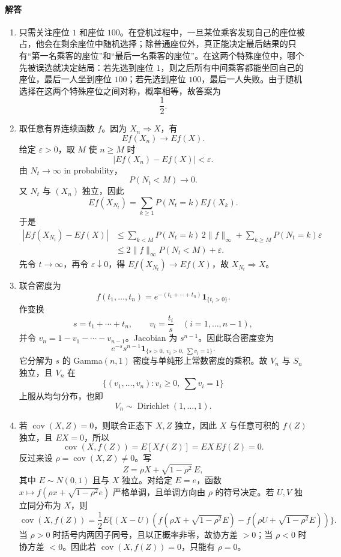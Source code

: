 \documentclass[UTF8,12pt]{ctexart}
\begin{document}
\paragraph{解答}
\begin{enumerate}[label=\textbf{\arabic*.},leftmargin=2.2em]
\item 只需关注座位 \(1\) 和座位 \(100\)。在登机过程中，一旦某位乘客发现自己的座位被占，他会在剩余座位中随机选择；除普通座位外，真正能决定最后结果的只有“第一名乘客的座位”和“最后一名乘客的座位”。在这两个特殊座位中，哪个先被误选就决定结局：若先选到座位 \(1\)，则之后所有中间乘客都能坐回自己的座位，最后一人坐到座位 \(100\)；若先选到座位 \(100\)，最后一人失败。由于随机选择在这两个特殊座位之间对称，概率相等，故答案为
\[
\frac12.
\]

\item 取任意有界连续函数 \(f\)。因为 \(X_n\Rightarrow X\)，有
\[
E f(X_n)\to E f(X).
\]
给定 \(\varepsilon>0\)，取 \(M\) 使 \(n\ge M\) 时
\[
|E f(X_n)-E f(X)|<\varepsilon.
\]
由 \(N_t\to\infty\) in probability，
\[
P(N_t<M)\to0.
\]
又 \(N_t\) 与 \((X_n)\) 独立，因此
\[
E f(X_{N_t})
=\sum_{k\ge1}P(N_t=k)E f(X_k).
\]
于是
\[
\begin{aligned}
|E f(X_{N_t})-E f(X)|
&\le \sum_{k<M}P(N_t=k)\,2\|f\|_\infty
+\sum_{k\ge M}P(N_t=k)\varepsilon\\
&\le 2\|f\|_\infty P(N_t<M)+\varepsilon.
\end{aligned}
\]
先令 \(t\to\infty\)，再令 \(\varepsilon\downarrow0\)，得 \(E f(X_{N_t})\to E f(X)\)，故 \(X_{N_t}\Rightarrow X\)。

\item 联合密度为
\[
f(t_1,\ldots,t_n)=e^{-(t_1+\cdots+t_n)}\mathbf1_{\{t_i>0\}}.
\]
作变换
\[
s=t_1+\cdots+t_n,\qquad v_i=\frac{t_i}{s}\quad (i=1,\ldots,n-1),
\]
并令 \(v_n=1-v_1-\cdots-v_{n-1}\)。Jacobian 为 \(s^{n-1}\)。因此联合密度变为
\[
e^{-s}s^{n-1}\mathbf1_{\{s>0,\ v_i>0,\ \sum v_i=1\}}.
\]
它分解为 \(s\) 的 Gamma\((n,1)\) 密度与单纯形上常数密度的乘积。故 \(V_n\) 与 \(S_n\) 独立，且 \(V_n\) 在
\[
\{(v_1,\ldots,v_n):v_i\ge0,\ \sum v_i=1\}
\]
上服从均匀分布，也即
\[
V_n\sim \operatorname{Dirichlet}(1,\ldots,1).
\]

\item 若 \(\operatorname{cov}(X,Z)=0\)，则联合正态下 \(X,Z\) 独立，因此 \(X\) 与任意可积的 \(f(Z)\) 独立，且 \(EX=0\)，所以
\[
\operatorname{cov}(X,f(Z))=E[Xf(Z)]=EX\,E f(Z)=0.
\]
反过来设 \(\rho=\operatorname{cov}(X,Z)\ne0\)。写
\[
Z=\rho X+\sqrt{1-\rho^2}\,E,
\]
其中 \(E\sim N(0,1)\) 且与 \(X\) 独立。对给定 \(E=e\)，函数 \(x\mapsto f(\rho x+\sqrt{1-\rho^2}e)\) 严格单调，且单调方向由 \(\rho\) 的符号决定。若 \(U,V\) 独立同分布为 \(X\)，则
\[
\operatorname{cov}(X,f(Z))
=\frac12 E\{(X-U)(f(\rho X+\sqrt{1-\rho^2}E)-f(\rho U+\sqrt{1-\rho^2}E))\}.
\]
当 \(\rho>0\) 时括号内两因子同号，且以正概率非零，故协方差 \(>0\)；当 \(\rho<0\) 时协方差 \(<0\)。因此若 \(\operatorname{cov}(X,f(Z))=0\)，只能有 \(\rho=0\)。


\end{enumerate}
\end{document}

